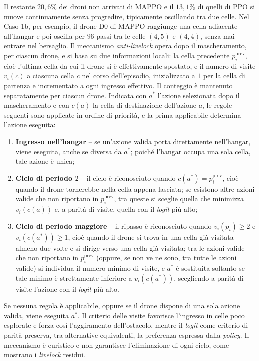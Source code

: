 \documentclass[12pt,a4paper,twoside]{report}
\begin{document}
Il restante $20,6\%$ dei droni non arrivati di MAPPO e il $13,1\%$ di quelli di PPO si muove continuamente senza progredire, tipicamente oscillando tra due celle. Nel Caso 1b, per esempio, il drone D0 di MAPPO raggiunge una cella adiacente all'hangar e poi oscilla per $96$ passi tra le celle $(4, 5)$ e $(4, 4)$, senza mai entrare nel bersaglio. Il meccanismo \emph{anti-livelock} opera dopo il mascheramento, per ciascun drone, e si basa su due informazioni locali: la cella precedente $p_i^{\text{prev}}$, cioè l'ultima cella da cui il drone si è effettivamente spostato, e il numero di visite $v_i(c)$ a ciascuna cella $c$ nel corso dell'episodio, inizializzato a $1$ per la cella di partenza e incrementato a ogni ingresso effettivo. Il conteggio è mantenuto separatamente per ciascun drone. Indicata con $a^*$ l'azione selezionata dopo il mascheramento e con $c(a)$ la cella di destinazione dell'azione $a$, le regole seguenti sono applicate in ordine di priorità, e la prima applicabile determina l'azione eseguita:
\begin{enumerate}
    \item \textbf{Ingresso nell'hangar} -- se un'azione valida porta direttamente nell'hangar, viene eseguita, anche se diversa da $a^*$; poiché l'hangar occupa una sola cella, tale azione è unica;
    \item \textbf{Ciclo di periodo $2$} -- il ciclo è riconosciuto quando $c(a^*) = p_i^{\text{prev}}$, cioè quando il drone tornerebbe nella cella appena lasciata; se esistono altre azioni valide che non riportano in $p_i^{\text{prev}}$, tra queste si sceglie quella che minimizza $v_i(c(a))$ e, a parità di visite, quella con il \emph{logit} più alto;
    \item \textbf{Ciclo di periodo maggiore} -- il ripasso è riconosciuto quando $v_i(p_i) \geq 2$ e $v_i(c(a^*)) \geq 1$, cioè quando il drone si trova in una cella già visitata almeno due volte e si dirige verso una cella già visitata; tra le azioni valide che non riportano in $p_i^{\text{prev}}$ (oppure, se non ve ne sono, tra tutte le azioni valide) si individua il numero minimo di visite, e $a^*$ è sostituita soltanto se tale minimo è strettamente inferiore a $v_i(c(a^*))$, scegliendo a parità di visite l'azione con il \emph{logit} più alto.
\end{enumerate}
Se nessuna regola è applicabile, oppure se il drone dispone di una sola azione valida, viene eseguita $a^*$. Il criterio delle visite favorisce l'ingresso in celle poco esplorate e forza così l'aggiramento dell'ostacolo, mentre il \emph{logit} come criterio di parità preserva, tra alternative equivalenti, la preferenza espressa dalla \emph{policy}. Il meccanismo è euristico e non garantisce l'eliminazione di ogni ciclo, come mostrano i \emph{livelock} residui.
\newpage
\end{document}

